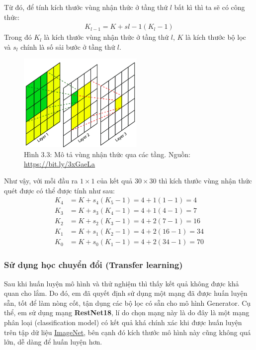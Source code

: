 \documentclass[a4paper]{article}
\begin{document}
\noindent
Từ đó, để tính kích thước vùng nhận thức ở tầng thứ $l$ bất kì thì ta sẽ có công thức:
\begin{align*}
    K_{l-1} = K + s{l-1}(K_{l} - 1)
\end{align*}
Trong đó $K_l$ là kích thước vùng nhận thức ở tầng thứ $l$, $K$ là kích thước bộ lọc và $s_{l}$ chính là số sải bước ở tầng thứ $l$.

\begin{figure}[h!]
\centering
\includegraphics[width=6cm]{images/3_3.png}
\caption{Hình 3.3: Mô tả vùng nhận thức qua các tầng. Nguồn: \href{https://bit.ly/3xGaeLa}{https://bit.ly/3xGaeLa}}
\end{figure}

\noindent
Như vậy, với mỗi đầu ra $1 \times 1$ của kết quả $30\times 30$ thì kích thước vùng nhận thức quét được có thể được tính như sau:
\begin{align*}
    K_4 &= K + s_4(K_5 - 1) = 4 + 1(1-1) = 4\\
    K_3 &= K + s_3(K_4 - 1) = 4 + 1(4-1) = 7\\
    K_2 &= K + s_2(K_3 - 1) = 4 + 2(7-1) = 16\\
    K_1 &= K + s_1(K_2 - 1) = 4 + 2(16-1) = 34\\
    K_0 &= K + s_0(K_1 - 1) = 4 + 2(34 - 1) = 70
\end{align*}


\subsubsection{Sử dụng học chuyển đổi (Transfer learning)}
Sau khi huấn luyện mô hình và thử nghiệm thì thấy kết quả không được khả quan cho lắm. Do đó, em đã quyết định sử dụng một mạng đã được huấn luyện sẵn, tốt để làm nòng cốt, tận dụng các bộ lọc có sẵn cho mô hình Generator. Cụ thể, em sử dụng mạng \textbf{RestNet18}, lí do chọn mạng này là do đây là một mạng phân loại (classification model) có kết quả khá chính xác khi được huấn luyện trên tập dữ liệu \href{http://www.image-net.org/download}{ImageNet}, bên cạnh đó kích thước mô hình này cũng không quá lớn, dễ dàng để huấn luyện hơn.
\end{document}
